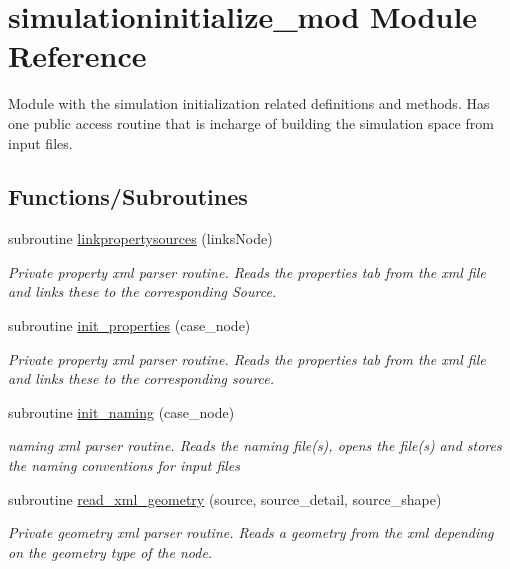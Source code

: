 \hypertarget{namespacesimulationinitialize__mod}{}\section{simulationinitialize\+\_\+mod Module Reference}
\label{namespacesimulationinitialize__mod}


Module with the simulation initialization related definitions and methods. Has one public access routine that is incharge of building the simulation space from input files.  


\subsection*{Functions/\+Subroutines}
\begin{DoxyCompactItemize}
\item 
subroutine \mbox{\hyperlink{namespacesimulationinitialize__mod_aa4c1099b84c9901ab1286a3796a54f71}{linkpropertysources}} (links\+Node)
\begin{DoxyCompactList}\small\item\em Private property xml parser routine. Reads the properties tab from the xml file and links these to the corresponding Source. \end{DoxyCompactList}\item 
subroutine \mbox{\hyperlink{namespacesimulationinitialize__mod_a532cb4960e93dc27cff5dc2e04afe070}{init\+\_\+properties}} (case\+\_\+node)
\begin{DoxyCompactList}\small\item\em Private property xml parser routine. Reads the properties tab from the xml file and links these to the corresponding source. \end{DoxyCompactList}\item 
subroutine \mbox{\hyperlink{namespacesimulationinitialize__mod_a4909cc4cb57549e6eed3f69d6dfa30b5}{init\+\_\+naming}} (case\+\_\+node)
\begin{DoxyCompactList}\small\item\em naming xml parser routine. Reads the naming file(s), opens the file(s) and stores the naming conventions for input files \end{DoxyCompactList}\item 
subroutine \mbox{\hyperlink{namespacesimulationinitialize__mod_ab65ac868a57f2cc124ec29f87a239424}{read\+\_\+xml\+\_\+geometry}} (source, source\+\_\+detail, source\+\_\+shape)
\begin{DoxyCompactList}\small\item\em Private geometry xml parser routine. Reads a geometry from the xml depending on the geometry type of the node. \end{DoxyCompactList}\item 

\end{DoxyCompactItemize}
